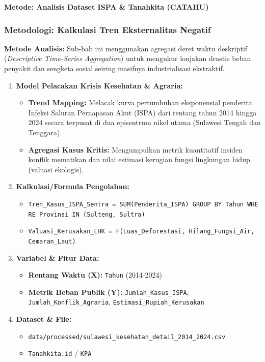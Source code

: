 \documentclass[
]{article}
\providecommand{\tightlist}{%
  \setlength{\itemsep}{0pt}\setlength{\parskip}{0pt}}
\begin{document}
\textbf{Metode: Analisis Dataset ISPA \& Tanahkita (CATAHU)}

\subsubsection{Metodologi: Kalkulasi Tren Eksternalitas
Negatif}\label{metodologi-kalkulasi-tren-eksternalitas-negatif}

\textbf{Metode Analisis:} Sub-bab ini menggunakan agregasi deret waktu
deskriptif (\emph{Descriptive Time-Series Aggregation}) untuk mengukur
lonjakan drastis beban penyakit dan sengketa sosial seiring masifnya
industrialisasi ekstraktif.

\begin{enumerate}
\def\labelenumi{\arabic{enumi}.}
\tightlist
\item
  \textbf{Model Pelacakan Krisis Kesehatan \& Agraria:}

  \begin{itemize}
  \tightlist
  \item
    \textbf{Trend Mapping:} Melacak kurva pertumbuhan eksponensial
    penderita Infeksi Saluran Pernapasan Akut (ISPA) dari rentang tahun
    2014 hingga 2024 secara terpusat di dua episentrum nikel utama
    (Sulawesi Tengah dan Tenggara).
  \item
    \textbf{Agregasi Kasus Kritis:} Mengumpulkan metrik kuantitatif
    insiden konflik mematikan dan nilai estimasi kerugian fungsi
    lingkungan hidup (valuasi ekologis).
  \end{itemize}
\item
  \textbf{Kalkulasi/Formula Pengolahan:}

  \begin{itemize}
  \tightlist
  \item
    \texttt{Tren\_Kasus\_ISPA\_Sentra\ =\ SUM(Penderita\_ISPA)\ GROUP\ BY\ Tahun\ WHERE\ Provinsi\ IN\ (Sulteng,\ Sultra)}
  \item
    \texttt{Valuasi\_Kerusakan\_LHK\ =\ F(Luas\_Deforestasi,\ Hilang\_Fungsi\_Air,\ Cemaran\_Laut)}
  \end{itemize}
\item
  \textbf{Variabel \& Fitur Data:}

  \begin{itemize}
  \tightlist
  \item
    \textbf{Rentang Waktu (X):} \texttt{Tahun} (2014-2024)
  \item
    \textbf{Metrik Beban Publik (Y):} \texttt{Jumlah\_Kasus\_ISPA},
    \texttt{Jumlah\_Konflik\_Agraria},
    \texttt{Estimasi\_Rupiah\_Kerusakan}
  \end{itemize}
\item
  \textbf{Dataset \& File:}

  \begin{itemize}
  \tightlist
  \item
    \texttt{data/processed/sulawesi\_kesehatan\_detail\_2014\_2024.csv}
  \item
    \texttt{Tanahkita.id} / \texttt{KPA}
  \end{itemize}
\end{enumerate}
\end{document}
